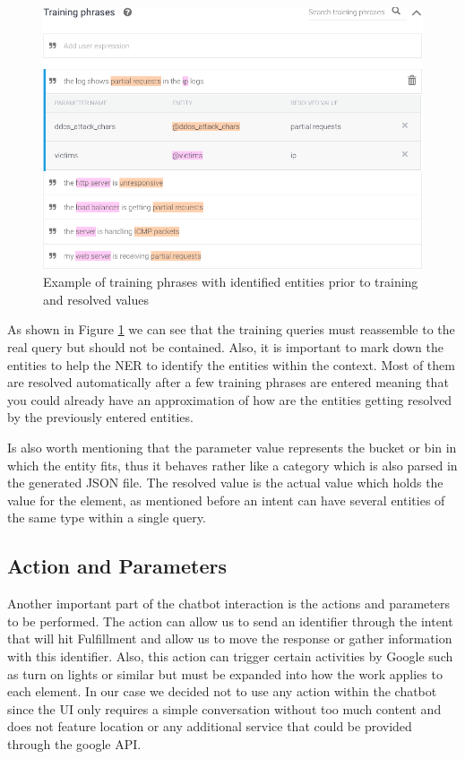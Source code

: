 \begin{figure}[!ht]
    \centering
    \includegraphics[scale=0.60]{MA-BA-Thesis/trainingPhrases.png}
    \caption{Example of training phrases with identified entities prior to training and resolved values}
    \label{fig:trainingPhrases}
\end{figure}
As shown in Figure \ref{fig:trainingPhrases} we can see that the training queries must reassemble to the real query but should not be contained. Also, it is important to mark down the entities to help the NER to identify the entities within the context. Most of them are resolved automatically after a few training phrases are entered meaning that you could already have an approximation of how are the entities getting resolved by the previously entered entities.

Is also worth mentioning that the parameter value represents the bucket or bin in which the entity fits, thus it behaves rather like a category which is also parsed in the generated JSON file. The resolved value is the actual value which holds the value for the element, as mentioned before an intent can have several entities of the same type within a single query.

\subsection{Action and Parameters}
Another important part of the chatbot interaction is the actions and parameters to be performed. The action can allow us to send an identifier through the intent that will hit Fulfillment and allow us to move the response or gather information with this identifier. Also, this action can trigger certain activities by Google such as turn on lights or similar but must be expanded into how the work applies to each element. In our case we decided not to use any action within the chatbot since the UI only requires a simple conversation without too much content and does not feature location or any additional service that could be provided through the google API.

